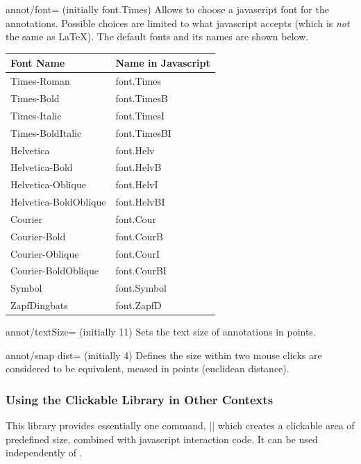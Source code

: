 \begin{pgfplotskey}{annot/font= (initially font.Times)}
	Allows to choose a javascript font for the annotations. Possible choices are limited to what javascript accepts (which is \emph{not} the same as \LaTeX). The default fonts and its names are shown below.

	\begin{center}
	\begin{tabular}{ll}
		\toprule
		Font Name	& Name in Javascript\\
		\midrule
		Times-Roman           & font.Times\\
        Times-Bold            & font.TimesB\\
        Times-Italic          & font.TimesI\\
        Times-BoldItalic      & font.TimesBI\\
        Helvetica             & font.Helv\\
        Helvetica-Bold        & font.HelvB\\
        Helvetica-Oblique     & font.HelvI\\
        Helvetica-BoldOblique & font.HelvBI\\
        Courier               & font.Cour\\
        Courier-Bold          & font.CourB\\
        Courier-Oblique       & font.CourI\\
        Courier-BoldOblique   & font.CourBI\\
        Symbol                & font.Symbol\\
        ZapfDingbats          & font.ZapfD\\
		\bottomrule
	\end{tabular}
	\end{center}
\end{pgfplotskey}

\begin{pgfplotskey}{annot/textSize= (initially 11)}
	Sets the text size of annotations in points.
\end{pgfplotskey}

\begin{pgfplotskey}{annot/snap dist= (initially 4)}
	Defines the size within two mouse clicks are considered to be equivalent, meased in points (euclidean distance).
\end{pgfplotskey}

\subsubsection{Using the Clickable Library in Other Contexts}
This library provides essentially one command, |\pgfplotsclickablecreate| which creates a clickable area of predefined size, combined with javascript interaction code. It can be used independently of \PGFPlots.


